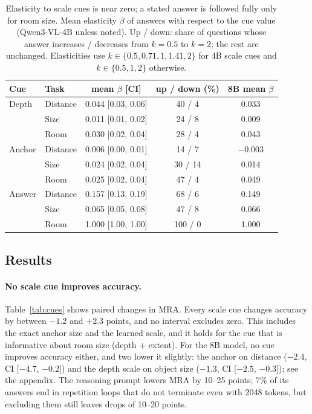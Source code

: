 \documentclass[letterpaper]{article} %
\begin{document}
\begin{table}[t]
\centering
\small
\setlength{\tabcolsep}{2.5pt}
\begin{tabular}{llccc}
\toprule
Cue & Task & mean $\beta$ [CI] & up / down (\%) & 8B mean $\beta$ \\
\midrule
Depth & Distance & 0.044 [0.03, 0.06] & 40 / 4 & 0.033 \\
 & Size & 0.011 [0.01, 0.02] & 24 / 8 & 0.009 \\
 & Room & 0.030 [0.02, 0.04] & 28 / 4 & 0.043 \\
Anchor & Distance & 0.006 [0.00, 0.01] & 14 / 7 & $-$0.003 \\
 & Size & 0.024 [0.02, 0.04] & 30 / 14 & 0.014 \\
 & Room & 0.025 [0.02, 0.04] & 47 / 4 & 0.049 \\
Answer & Distance & 0.157 [0.13, 0.19] & 68 / 6 & 0.149 \\
 & Size & 0.065 [0.05, 0.08] & 47 / 8 & 0.066 \\
 & Room & 1.000 [1.00, 1.00] & 100 / 0 & 1.000 \\
\bottomrule
\end{tabular}
\caption{Elasticity to scale cues is near zero; a stated answer is followed fully only for room size. Mean elasticity $\beta$ of answers with respect to the cue value (Qwen3-VL-4B unless noted). Up / down: share of questions whose answer increases / decreases from $k=0.5$ to $k=2$; the rest are unchanged. Elasticities use $k \in \{0.5, 0.71, 1, 1.41, 2\}$ for 4B scale cues and $k \in \{0.5, 1, 2\}$ otherwise.}
\label{tab:elasticity}
\end{table}

\subsection{Results}

\paragraph{No scale cue improves accuracy.}
Table~\ref{tab:cues} shows paired changes in MRA. Every scale cue changes accuracy by between $-1.2$ and $+2.3$ points, and no interval excludes zero. This includes the exact anchor size and the learned scale, and it holds for the cue that is informative about room size (depth + extent). For the 8B model, no cue improves accuracy either, and two lower it slightly: the anchor on distance ($-2.4$, CI [$-4.7$, $-0.2$]) and the depth scale on object size ($-1.3$, CI [$-2.5$, $-0.3$]); see the appendix. The reasoning prompt lowers MRA by 10--25 points; 7\% of its answers end in repetition loops that do not terminate even with 2048 tokens, but excluding them still leaves drops of 10--20 points.
\end{document}
